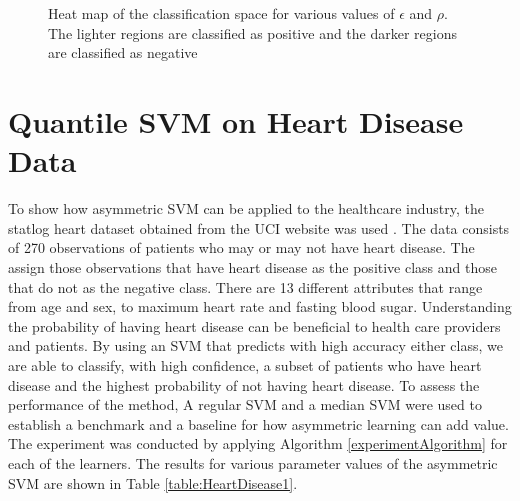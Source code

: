 \documentclass[twoside,11pt]{article}
\begin{document}
\begin{figure}[htp]
  \begin{center}
     \\
     \\
  \end{center}
  \caption{Heat map of the classification space for various values of $\epsilon$ and $\rho$. The lighter regions are classified as positive and the darker regions are classified as negative}
  \label{fig:edge}
\end{figure}



\section{Quantile SVM on Heart Disease Data}\label{Heartdiseasesection}
To show how asymmetric SVM can be applied to the healthcare industry, the statlog heart dataset obtained from the UCI website was used \citep{Frank10}. The data consists of 270 observations of patients who may or may not have heart disease. The assign those observations that have heart disease as the positive class and those that do not as the negative class. There are 13 different attributes that range from age and sex, to maximum heart rate and fasting blood sugar. Understanding the probability of having heart disease can be beneficial to health care providers and patients. By using an SVM that predicts with high accuracy either class, we are able to classify, with high confidence, a subset of patients who have heart disease and the highest probability of not having heart disease. To assess the performance of the method, A regular SVM and a median SVM were used to establish a benchmark and a baseline for how asymmetric learning can add value. The experiment was conducted by applying Algorithm \ref{experimentAlgorithm} for each of the learners. The results for various parameter values of the asymmetric SVM are shown in Table \ref{table:HeartDisease1}. 
\end{document}
